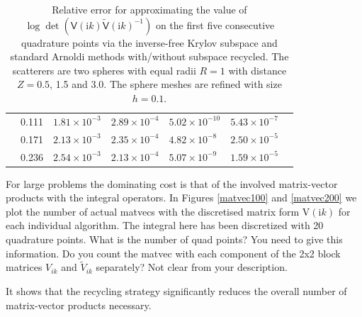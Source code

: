 \begin{table}[H]
\begin{tabular}{ |M{1.5cm}|M{2.0cm}|M{2.2cm} |M{2.2cm}|M{3cm}|M{3cm}|M{2.2cm}| }
                                   & 0.111    & $1.81\times 10^{-3}$  & $2.89\times 10^{-4}$  &$5.02\times 10^{-10}$ &$5.43\times 10^{-7}$\\ 
                                   & 0.171    & $2.13\times 10^{-3}$  & $2.35\times 10^{-4}$  &$4.82\times 10^{-8}$  &$2.50\times 10^{-5}$\\ 
                                   & 0.236    & $2.54\times 10^{-3}$  & $2.13\times 10^{-4}$  &$5.07\times 10^{-9}$  &$1.59\times 10^{-5}$\\ 
    \hline
    \end{tabular}
    \caption{Relative error for approximating the value of $\log\det(\mathsf{V}(\mathrm{i}k)\tilde{\mathsf{V}}(\mathrm{i}k)^{-1})$ on the first five consecutive 
    quadrature points via the inverse-free Krylov subspace and standard Arnoldi methods with/without subspace recycled. The scatterers are two spheres with 
    equal radii $R = 1$ with distance $Z = 0.5$, 1.5 and 3.0. The sphere meshes are refined with size $h = 0.1$.}
    \label{Table lists the logdet}
    \end{table}
    
For large problems the dominating cost is that of the involved matrix-vector products with the integral operators. 
{\color{teal} In Figures \ref{matvec100} and \ref{matvec200} we plot the number of actual matvecs with the discretised matrix form $\mathrm{V}(\mathrm{i}k)$ for each individual algorithm.} The integral here has been discretized with {\color {teal} 20} quadrature
points. {\color{red} What is the number of quad points? You need to give this information.} {\color{red} Do you count the matvec with each component of the
2x2 block matrices $V_{ik}$ and $\tilde{V}_{ik}$ separately? Not clear from your description.} 

It shows that the recycling strategy significantly reduces the overall number of matrix-vector products necessary.


